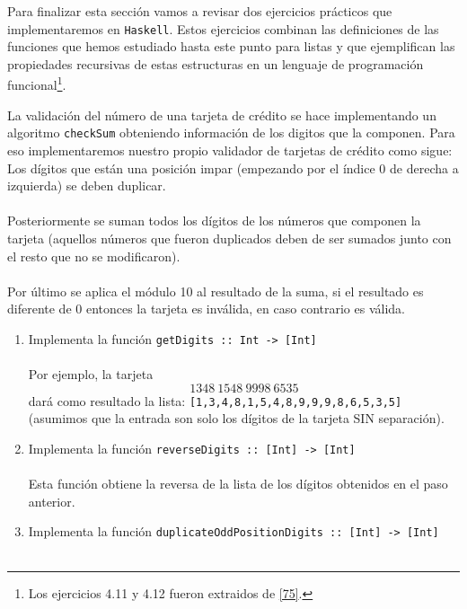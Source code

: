     Para finalizar esta sección vamos a revisar dos ejercicios prácticos que implementaremos en \texttt{Haskell}. Estos ejercicios combinan las definiciones de las funciones que hemos estudiado hasta este punto para listas y que ejemplifican las propiedades recursivas de estas estructuras en un lenguaje de programación funcional\footnote{Los ejercicios 4.11 y 4.12 fueron extraidos de \hyperlink{75}{[75]}.}.


    \begin{exercise}
        La validación del número de una tarjeta de crédito se hace implementando un algoritmo \texttt{checkSum} obteniendo información de los digitos que la componen. Para eso implementaremos nuestro propio validador de tarjetas de crédito como sigue:\\
    
        Los dígitos que están una posición impar (empezando por el índice 0 de derecha a izquierda) se deben duplicar. \\\\
        Posteriormente se suman todos los dígitos de los números que componen la tarjeta (aquellos números que fueron duplicados deben de ser sumados junto con el resto que no se modificaron).\\\\
        Por último se aplica el módulo 10 al resultado de la suma, si el resultado es diferente de 0 entonces la tarjeta es inválida, en caso contrario es válida.\\
        \begin{enumerate} 
           \item  Implementa la función {\tt getDigits :: Int ->\ [Int]} \\\\
                  Por ejemplo, la tarjeta \[1348\ 1548\ 9998\ 6535\] dará como resultado la lista: \texttt{[1,3,4,8,1,5,4,8,9,9,9,8,6,5,3,5]} \\
                  (asumimos que la entrada son solo los dígitos de la tarjeta SIN separación).\\
           \item  Implementa la función \texttt{reverseDigits ::  [Int] ->\ [Int]} \\\\
                  Esta función obtiene la reversa de la lista de los dígitos obtenidos en el paso anterior.\\
           \item  Implementa la función \texttt{duplicateOddPositionDigits ::  [Int] ->\ [Int]} \\\\

\end{enumerate}
\end{exercise}
